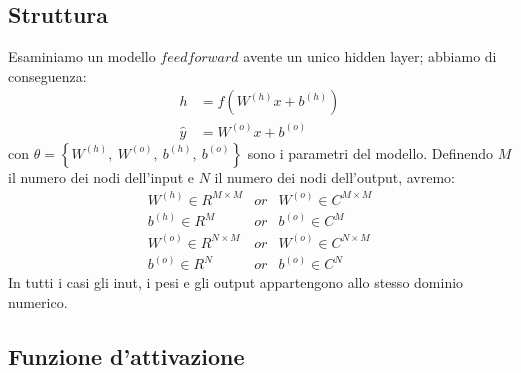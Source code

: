 \documentclass[a4paper,10pt]{article}
\begin{document}
 \subsection{Struttura}
 Esaminiamo un modello $feedforward$ avente un unico hidden layer; abbiamo di conseguenza:
 \begin{align}
  h &= f\left(W^{\left(h\right)}x+b^{\left(h\right)}\right)\\
  \widehat{y} &= W^{\left(o\right)}x+b^{\left(o\right)}
 \end{align}
 con $\theta = \left \{ W^{\left(h\right)}, \ W^{\left(o\right)}, \ b^{\left(h\right)}, \ b^{\left(o\right)}\right \}$ sono i parametri del modello. Definendo $M$ il numero dei nodi dell'input e $N$ il numero dei nodi dell'output, avremo:
 \begin{equation}
  \begin{matrix}
   W^{\left( h\right) } \in R^{M\times M} & or & W^{\left( o\right) } \in C^{M\times M}\\
   b^{\left( h\right) } \in R^M & or & b^{\left( o\right) } \in C^M\\
   W^{\left( o\right) } \in R^{N\times M} & or & W^{\left( o\right) } \in C^{N\times M}\\
   b^{\left( o\right) } \in R^N & or & b^{\left( o\right) } \in C^N
  \end{matrix}
 \end{equation}
 In tutti i casi gli inut, i pesi e gli output appartengono allo stesso dominio numerico.
 
 \subsection{Funzione d'attivazione}
 
\end{document}
